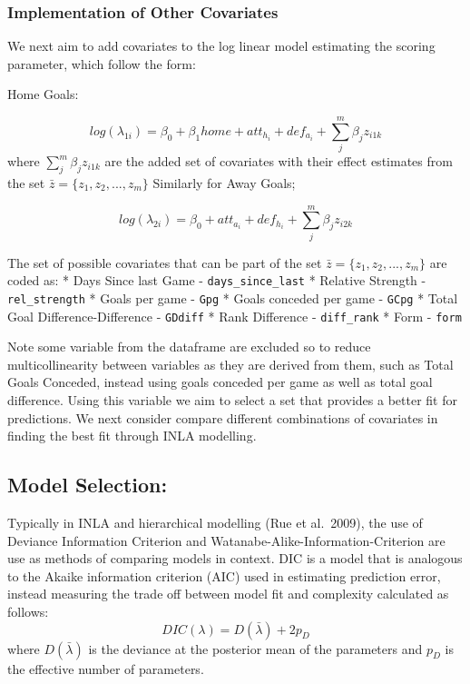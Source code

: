\documentclass[
]{article}
\begin{document}
\hypertarget{implementation-of-other-covariates}{%
\subsubsection{Implementation of Other
Covariates}\label{implementation-of-other-covariates}}

We next aim to add covariates to the log linear model estimating the
scoring parameter, which follow the form:

Home Goals:

\[log(\lambda_{1i}) = \beta_0 + \beta_1 home + att_{h_i} + def_{a_i} + \sum^m_j\beta_jz_{i1k}\]
where \(\sum^m_j\beta_jz_{i1k}\) are the added set of covariates with
their effect estimates from the set \(\bar{z}= \{ {z_1,z_2,...,z_m} \}\)
Similarly for Away Goals;

\[log(\lambda_{2i}) = \beta_0 + att_{a_i} + def_{h_i} + \sum^m_j\beta_jz_{i2k}\]

The set of possible covariates that can be part of the set
\(\bar{z}= \{ {z_1,z_2,...,z_m} \}\) are coded as: * Days Since last
Game - \texttt{days\_since\_last} * Relative Strength -
\texttt{rel\_strength} * Goals per game - \texttt{Gpg} * Goals conceded
per game - \texttt{GCpg} * Total Goal Difference-Difference -
\texttt{GDdiff} * Rank Difference - \texttt{diff\_rank} * Form -
\texttt{form}

Note some variable from the dataframe are excluded so to reduce
multicollinearity between variables as they are derived from them, such
as Total Goals Conceded, instead using goals conceded per game as well
as total goal difference. Using this variable we aim to select a set
that provides a better fit for predictions. We next consider compare
different combinations of covariates in finding the best fit through
INLA modelling.

\hypertarget{model-selection}{%
\subsection{Model Selection:}\label{model-selection}}

Typically in INLA and hierarchical modelling (Rue et al.~2009), the use
of Deviance Information Criterion and
Watanabe-Alike-Information-Criterion are use as methods of comparing
models in context. DIC is a model that is analogous to the Akaike
information criterion (AIC) used in estimating prediction error, instead
measuring the trade off between model fit and complexity calculated as
follows: \[ DIC(\lambda) =  D(\bar{\lambda}) + 2p_D \] where
\(D(\bar{\lambda})\) is the deviance at the posterior mean of the
parameters and \(p_D\) is the effective number of parameters.
\end{document}

